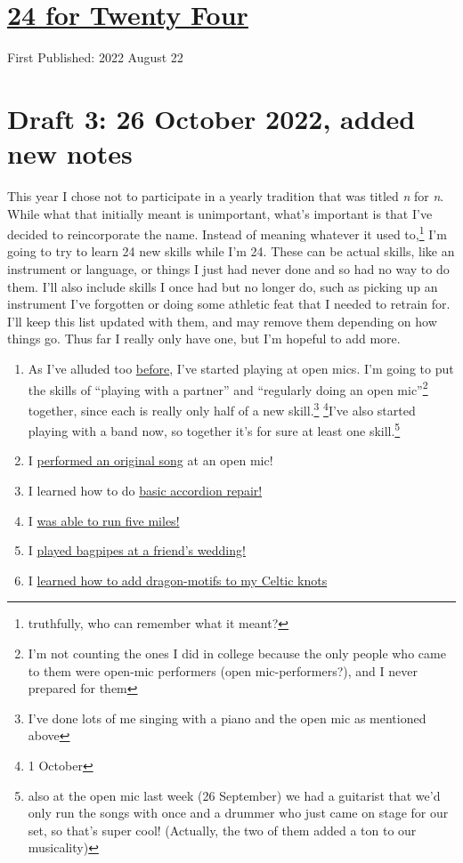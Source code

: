 \documentclass[12pt]{article}[titlepage]
\newcommand{\say}[1]{``#1''}
\newcommand{\1}{\={a}}
\newcommand{\2}{\={e}}
\newcommand{\3}{\={\i}}
\newcommand{\4}{\=o}
\newcommand{\5}{\=u}
\newcommand{\6}{\={A}}
\renewcommand{\,}{\textsuperscript{,}}
\begin{document}
\doublespacing
\section{\href{twenty-four-html}{24 for Twenty Four}}
First Published: 2022 August 22
\section{Draft 3: 26 October 2022, added new notes}
This year I chose not to participate in a yearly tradition that was titled \textit{n} for \textit{n}.
While what that initially meant is unimportant, what's important is that I've decided to reincorporate the name.
Instead of meaning whatever it used to,\footnote{truthfully, who can remember what it meant?} I'm going to try to learn 24 new skills while I'm 24.
These can be actual skills, like an instrument or language, or things I just had never done and so had no way to do them.
I'll also include skills I once had but no longer do, such as picking up an instrument I've forgotten or doing some athletic feat that I needed to retrain for.
I'll keep this list updated with them, and may remove them depending on how things go.
Thus far I really only have one, but I'm hopeful to add more.

\begin{enumerate}
\item As I've alluded too \href{open-mic-2.html}{before}, I've started playing at open mics.
I'm going to put the skills of \say{playing with a partner} and \say{regularly doing an open mic}\footnote{I'm not counting the ones I did in college because the only people who came to them were open-mic performers (open mic-performers?), and I never prepared for them} together, since each is really only half of a new skill.\footnote{I've done lots of me singing with a piano and the open mic as mentioned above} \footnote{1 October}I've also started playing with a band now, so together it's for sure at least one skill.\footnote{also at the open mic last week (26 September) we had a guitarist that we'd only run the songs with once and a drummer who just came on stage for our set, so that's super cool! (Actually, the two of them added a ton to our musicality)}
\item I \href{performing-a-song.html}{performed an original song} at an open mic!
\item I learned how to do \href{accordion-repair.html}{basic accordion repair!}
\item I \href{running-2.html}{was able to run five miles!} 
\item I \href{bagpipes.html}{played bagpipes at a friend's wedding!}
\item I \href{celtic-knots.html}{learned how to add dragon-motifs to my Celtic knots}
\end{enumerate}
\end{document}
